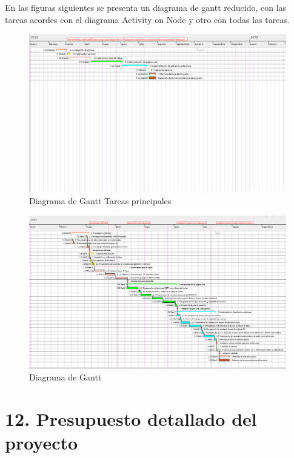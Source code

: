 \documentclass[
11pt, %
]{charter}
\begin{document}
En las figuras siguientes se presenta un diagrama de gantt reducido, con las tareas acordes con el diagrama Activity on Node y otro con todas las tareas.

\begin{landscape}
\begin{figure}[htpb]
\centering 
\includegraphics[height=.85\textheight]{./Figuras/Tareas-reducida.png}
\caption{Diagrama de Gantt Tareas principales}
\label{fig:diagGantt}
\end{figure}
\end{landscape}


\newpage
\begin{landscape}
\begin{figure}[htpb]
\centering 
\includegraphics[height=.85\textheight]{./Figuras/tareas.png}
\caption{Diagrama de Gantt}
\label{fig:diagGantt}
\end{figure}

\end{landscape}

\section{12. Presupuesto detallado del proyecto}
\label{sec:presupuesto}
\end{document}
